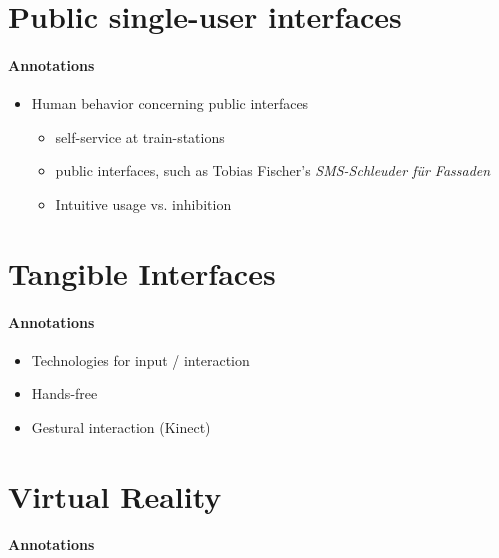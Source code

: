
\section{Public single-user interfaces}
\label{motivation_single}

\paragraph{Annotations}

\begin{itemize}
	\item Human behavior concerning public interfaces
	\begin{itemize}
		\item self-service at train-stations
		\item public interfaces, such as Tobias Fischer's \textit{SMS-Schleuder für Fassaden}
		\item Intuitive usage vs. inhibition
	\end{itemize}
\end{itemize}

\section{Tangible Interfaces}
\label{related_work_tangible}

\paragraph{Annotations}

\begin{itemize}
	\item Technologies for input / interaction
	\item Hands-free
	\item Gestural interaction (Kinect)
\end{itemize}


\section{Virtual Reality}
\label{motivation_vr}

\paragraph{Annotations}

